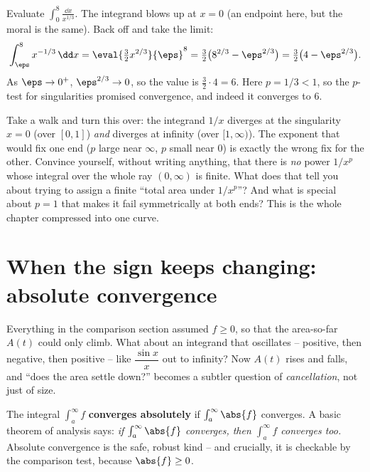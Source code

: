\begin{example}
\label{ch25:ex-interior}
Evaluate $\displaystyle\int_0^{8}\frac{\dd x}{x^{1/3}}$. The integrand blows up at
$x=0$ (an endpoint here, but the moral is the same). Back off and take the limit:
\[
  \int_{\eps}^{8} x^{-1/3}\,\dd x
  = \eval{\tfrac{3}{2}x^{2/3}}{\eps}^{8}
  = \tfrac{3}{2}\bigl(8^{2/3} - \eps^{2/3}\bigr)
  = \tfrac{3}{2}\bigl(4 - \eps^{2/3}\bigr).
\]
As $\eps\to 0^+$, $\eps^{2/3}\to 0$, so the value is $\tfrac{3}{2}\cdot 4 = 6$.
Here $p = 1/3 < 1$, so the $p$-test for singularities promised convergence, and
indeed it converges to $6$.
\end{example}

\begin{walkbox}
Take a walk and turn this over: the integrand $1/x$ diverges at the singularity
$x=0$ (over $[0,1]$) \emph{and} diverges at infinity (over $[1,\infty)$). The
exponent that would fix one end ($p$ large near $\infty$, $p$ small near $0$) is
exactly the wrong fix for the other. Convince yourself, without writing anything,
that there is \emph{no} power $1/x^p$ whose integral over the whole ray
$(0,\infty)$ is finite. What does that tell you about trying to assign a finite
``total area under $1/x^p$''? And what is special about $p=1$ that makes it fail
symmetrically at both ends? This is the whole chapter compressed into one curve.
\end{walkbox}

\section{When the sign keeps changing: absolute convergence}
\label{ch25:absolute}

Everything in the comparison section assumed $f \ge 0$, so that the area-so-far
$A(t)$ could only climb. What about an integrand that oscillates -- positive, then
negative, then positive -- like $\dfrac{\sin x}{x}$ out to infinity? Now $A(t)$
rises and falls, and ``does the area settle down?'' becomes a subtler question of
\emph{cancellation}, not just of size.

\begin{definition}
\label{ch25:def-absolute}
The integral $\int_a^\infty f$ \textbf{converges absolutely} if
$\int_a^\infty \abs{f}$ converges. A basic theorem of analysis says: \emph{if
$\int_a^\infty \abs{f}$ converges, then $\int_a^\infty f$ converges too.} Absolute
convergence is the safe, robust kind -- and crucially, it is checkable by the
comparison test, because $\abs{f} \ge 0$.
\end{definition}

